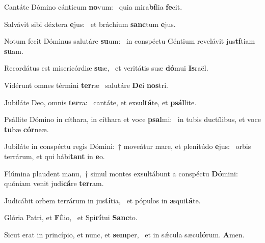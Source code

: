 \item Cantáte Dómino cánticum \textbf{no}vum:~\psstar{} quia mira\textbf{bí}lia \textbf{fe}cit.
\item Salvávit sibi déxtera \textbf{e}jus:~\psstar{} et bráchium \textbf{sanc}tum \textbf{e}jus.
\item Notum fecit Dóminus salutáre \textbf{su}um:~\psstar{} in conspéctu Géntium revelávit jus\textbf{tí}tiam \textbf{su}am.
\item Recordátus est misericórdiæ \textbf{su}æ,~\psstar{} et veritátis suæ \textbf{dó}mui \textbf{Is}raël.
\item Vidérunt omnes términi \textbf{ter}ræ~\psstar{} salutáre \textbf{De}i \textbf{nos}tri.
\item Jubiláte Deo, omnis \textbf{ter}ra:~\psstar{} cantáte, et exsul\textbf{tá}te, et \textbf{psál}lite.
\item Psállite Dómino in cíthara, in cíthara et voce \textbf{psal}mi:~\psstar{} in tubis ductílibus, et voce \textbf{tu}bæ \textbf{cór}neæ.
\item Jubiláte in conspéctu regis Dómini:~† moveátur mare, et plenitúdo \textbf{e}jus:~\psstar{} orbis terrárum, et qui hábi\textbf{tant} in \textbf{e}o.
\item Flúmina plaudent manu,~† simul montes exsultábunt a conspéctu \textbf{Dó}mini:~\psstar{} quóniam venit judi\textbf{cá}re \textbf{ter}ram.
\item Judicábit orbem terrárum in jus\textbf{tí}tia,~\psstar{} et pópulos in \textbf{æ}qui\textbf{tá}te.
\item Glória Patri, et \textbf{Fí}lio,~\psstar{} et Spi\textbf{rí}tui \textbf{Sanc}to.
\item Sicut erat in princípio, et nunc, et \textbf{sem}per,~\psstar{} et in sǽcula sæcu\textbf{ló}rum. \textbf{A}men.
